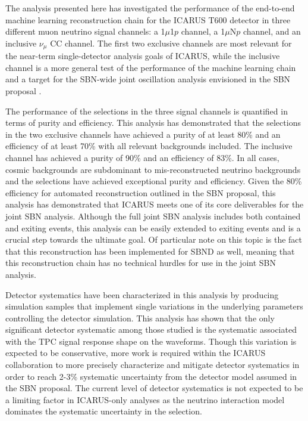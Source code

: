 The analysis presented here has investigated the performance of the end-to-end machine learning reconstruction chain for the ICARUS T600 detector in three different muon neutrino signal channels: a 1$\mu$1$p$ channel, a 1$\mu$N$p$ channel, and an inclusive $\nu_\mu$ CC channel. The first two exclusive channels are most relevant for the near-term single-detector analysis goals of ICARUS, while the inclusive channel is a more general test of the performance of the machine learning chain and a target for the SBN-wide joint oscillation analysis envisioned in the SBN proposal \cite{Acciarri2015}. 

The performance of the selections in the three signal channels is quantified in terms of purity and efficiency. This analysis has demonstrated that the selections in the two exclusive channels have achieved a purity of at least 80\% and an efficiency of at least 70\% with all relevant backgrounds included. The inclusive channel has achieved a purity of 90\% and an efficiency of 83\%. In all cases, cosmic backgrounds are subdominant to mis-reconstructed neutrino backgrounds and the selections have achieved exceptional purity and efficiency. Given the 80\% efficiency for automated reconstruction outlined in the SBN proposal, this analysis has demonstrated that ICARUS meets one of its core deliverables for the joint SBN analysis. Although the full joint SBN analysis includes both contained and exiting events, this analysis can be easily extended to exiting events and is a crucial step towards the ultimate goal. Of particular note on this topic is the fact that this reconstruction has been implemented for SBND as well, meaning that this reconstruction chain has no technical hurdles for use in the joint SBN analysis.

Detector systematics have been characterized in this analysis by producing simulation samples that implement single variations in the underlying parameters controlling the detector simulation. This analysis has shown that the only significant detector systematic among those studied is the systematic associated with the TPC signal response shape on the waveforms. Though this variation is expected to be conservative, more work is required within the ICARUS collaboration to more precisely characterize and mitigate detector systematics in order to reach 2-3\% systematic uncertainty from the detector model assumed in the SBN proposal. The current level of detector systematics is not expected to be a limiting factor in ICARUS-only analyses as the neutrino interaction model dominates the systematic uncertainty in the selection.

